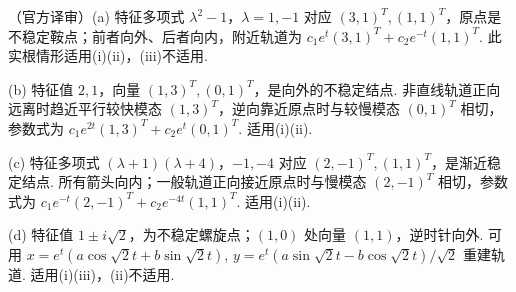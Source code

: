 \begin{solution}（官方译审）(a) 特征多项式 $\lambda^2-1$，$\lambda=1,-1$ 对应 $(3,1)^T,(1,1)^T$，原点是不稳定鞍点；前者向外、后者向内，附近轨道为 $c_1e^t(3,1)^T+c_2e^{-t}(1,1)^T$. 此实根情形适用(i)(ii)，(iii)不适用.

(b) 特征值 $2,1$，向量 $(1,3)^T,(0,1)^T$，是向外的不稳定结点. 非直线轨道正向远离时趋近平行较快模态 $(1,3)^T$，逆向靠近原点时与较慢模态 $(0,1)^T$ 相切，参数式为 $c_1e^{2t}(1,3)^T+c_2e^t(0,1)^T$. 适用(i)(ii).

(c) 特征多项式 $(\lambda+1)(\lambda+4)$，$-1,-4$ 对应 $(2,-1)^T,(1,1)^T$，是渐近稳定结点. 所有箭头向内；一般轨道正向接近原点时与慢模态 $(2,-1)^T$ 相切，参数式为 $c_1e^{-t}(2,-1)^T+c_2e^{-4t}(1,1)^T$. 适用(i)(ii).

(d) 特征值 $1\pm i\sqrt2$，为不稳定螺旋点；$(1,0)$ 处向量 $(1,1)$，逆时针向外. 可用 $x=e^t(a\cos\sqrt2t+b\sin\sqrt2t)$, $y=e^t(a\sin\sqrt2t-b\cos\sqrt2t)/\sqrt2$ 重建轨道. 适用(i)(iii)，(ii)不适用.


\end{solution}
